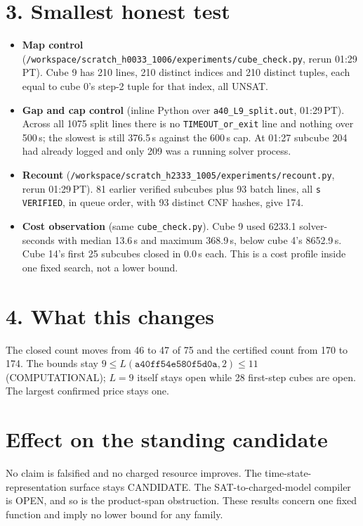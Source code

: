 \documentclass[11pt]{article}
\begin{document}
\section*{3. Smallest honest test}
\begin{itemize}
\item \textbf{Map control} (\texttt{/workspace/scratch\_h0033\_1006/experiments/cube\_check.py}, rerun 01:29\,PT). Cube 9 has 210 lines, 210 distinct indices and 210 distinct tuples, each equal to cube 0's step-2 tuple for that index, all UNSAT.
\item \textbf{Gap and cap control} (inline Python over \texttt{a40\_L9\_split.out}, 01:29\,PT). Across all 1075 split lines there is no \texttt{TIMEOUT\_or\_exit} line and nothing over 500\,s; the slowest is still 376.5\,s against the 600\,s cap. At 01:27 subcube 204 had already logged and only 209 was a running solver process.
\item \textbf{Recount} (\texttt{/workspace/scratch\_h2333\_1005/experiments/recount.py}, rerun 01:29\,PT). 81 earlier verified subcubes plus 93 batch lines, all \texttt{s VERIFIED}, in queue order, with 93 distinct CNF hashes, give 174.
\item \textbf{Cost observation} (same \texttt{cube\_check.py}). Cube 9 used 6233.1 solver-seconds with median 13.6\,s and maximum 368.9\,s, below cube 4's 8652.9\,s. Cube 14's first 25 subcubes closed in 0.0\,s each. This is a cost profile inside one fixed search, not a lower bound.
\end{itemize}

\section*{4. What this changes}
The closed count moves from 46 to 47 of 75 and the certified count from 170 to 174. The bounds stay $9\le L(\texttt{a40ff54e580f5d0a},2)\le 11$ (COMPUTATIONAL); $L=9$ itself stays open while 28 first-step cubes are open. The largest confirmed price stays one.

\section*{Effect on the standing candidate}
No claim is falsified and no charged resource improves. The time-state-representation surface stays CANDIDATE. The SAT-to-charged-model compiler is OPEN, and so is the product-span obstruction. These results concern one fixed function and imply no lower bound for any family.
\end{document}
